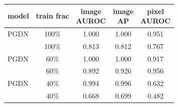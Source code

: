 \setlength{\tabcolsep}{3pt}
\begin{tabular}{@{}lcccc@{}}
\toprule
model & train frac & \shortstack{image\\AUROC} & \shortstack{image\\AP} & \shortstack{pixel\\AUROC} \\
\midrule
PGDN & 100\% & 1.000 & 1.000 & 0.951 \\
\draem{} & 100\% & 0.813 & 0.812 & 0.767 \\
PGDN & 60\% & 1.000 & 1.000 & 0.917 \\
\draem{} & 60\% & 0.892 & 0.926 & 0.956 \\
PGDN & 40\% & 0.994 & 0.996 & 0.632 \\
\draem{} & 40\% & 0.668 & 0.699 & 0.482 \\
\bottomrule
\end{tabular}
